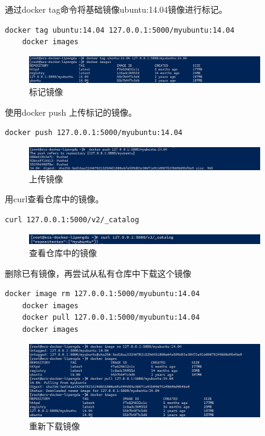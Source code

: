 \documentclass{article}
\begin{document}
通过docker tag命令将基础镜像ubuntu:14.04镜像进行标记。

\begin{lstlisting}[language=bash]
    docker tag ubuntu:14.04 127.0.0.1:5000/myubuntu:14.04
    docker images
\end{lstlisting} 

\begin{figure}[H]
\centering
\includegraphics[width=0.9\textwidth]{img/2.5.1.3.png}
\caption{标记镜像}
\end{figure}

使用docker push 上传标记的镜像。

\begin{lstlisting}[language=bash]
    docker push 127.0.0.1:5000/myubuntu:14.04
\end{lstlisting}

\begin{figure}[H]
\centering
\includegraphics[width=0.9\textwidth]{img/2.5.1.4.png}
\caption{上传镜像}
\end{figure}

用curl查看仓库中的镜像。

\begin{lstlisting}[language=bash]
    curl 127.0.0.1:5000/v2/_catalog
\end{lstlisting}

\begin{figure}[H]
\centering
\includegraphics[width=0.9\textwidth]{img/0.2.5.1.5.png}
\caption{查看仓库中的镜像}
\end{figure}

删除已有镜像，再尝试从私有仓库中下载这个镜像

\begin{lstlisting}[language=bash]
    docker image rm 127.0.0.1:5000/myubuntu:14.04
    docker images
    docker pull 127.0.0.1:5000/myubuntu:14.04
    docker images
\end{lstlisting}

\begin{figure}[H]
\centering
\includegraphics[width=0.9\textwidth]{img/2.5.1.6.png}
\caption{重新下载镜像}
\end{figure}
\end{document}
